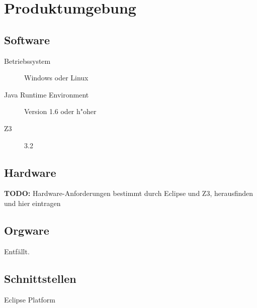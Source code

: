 \section{Produktumgebung}%

\subsection{Software}%

\begin{description}%
    \item [Betriebssystem] \see Windows oder \see Linux%
    \item [\see Java Runtime Environment] Version 1.6 oder h"oher%
    \item [\see Z3] 3.2%
\end{description}%

\subsection{Hardware}%

\textbf{TODO:} Hardware-Anforderungen bestimmt durch Eclipse und Z3, herausfinden und hier eintragen%

\subsection{\see Orgware}%

Entfällt.%

\subsection{Schnittstellen}%

\begin{description}%
    \item [\see Eclipse Platform]%
\end{description}%
